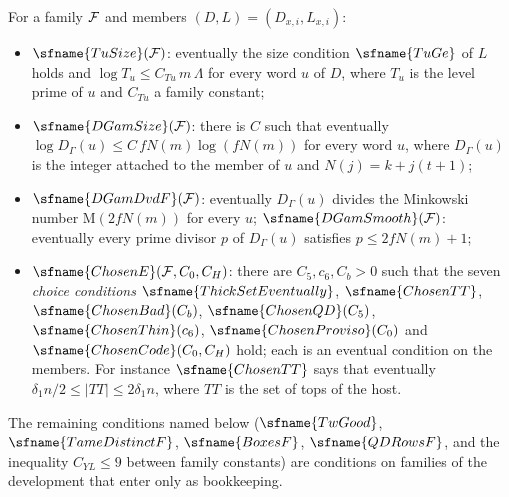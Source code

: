 \begin{definition}\label{pf:top-shape:sizes}
For a family $\mathcal{F}$ and members $(D,L)=(D_{x,i},L_{x,i})$:
\begin{itemize}
\item $\sfname{TuSize}(\topshapeF)$: eventually the size condition $\sfname{TuGe}$ of $L$ holds and
$\log T_u\le C_{Tu}\,m\,\Lambda$ for every word $u$ of $D$, where $T_u$ is the level prime of $u$ and $C_{Tu}$ a
family constant;
\item $\sfname{DGamSize}(\topshapeF)$: there is $C$ such that eventually $\log D_\Gamma(u)\le C\,fN(m)\log(fN(m))$
for every word $u$, where $D_\Gamma(u)$ is the integer attached to the member of $u$ and $N(j)=k+j(t+1)$;
\item $\sfname{DGamDvdF}(\topshapeF)$: eventually $D_\Gamma(u)$ divides the Minkowski number
$\mathrm{M}(2fN(m))$ for every $u$; $\sfname{DGamSmooth}(\topshapeF)$: eventually every prime divisor $p$ of
$D_\Gamma(u)$ satisfies $p\le2fN(m)+1$;
\item $\sfname{ChosenE}(\topshapeF,C_0,C_H)$: there are $C_5,c_6,C_b>0$ such that the seven \emph{choice
conditions} $\sfname{ThickSetEventually}$, $\sfname{ChosenTT}$, $\sfname{ChosenBad}(C_b)$,
$\sfname{ChosenQD}(C_5)$, $\sfname{ChosenThin}(c_6)$, $\sfname{ChosenProviso}(C_0)$ and
$\sfname{ChosenCode}(C_0,C_H)$ hold; each is an eventual condition on the members. For instance
$\sfname{ChosenTT}$ says that eventually $\delta_1n/2\le|TT|\le2\delta_1n$, where $TT$ is the set of tops of
the host.
\end{itemize}
The remaining conditions named below ($\sfname{TwGood}$, $\sfname{TameDistinctF}$, $\sfname{BoxesF}$,
$\sfname{QDRowsF}$, and the inequality $C_{YL}\le9$ between family constants) are conditions on families of the
development that enter only as bookkeeping.
\end{definition}

